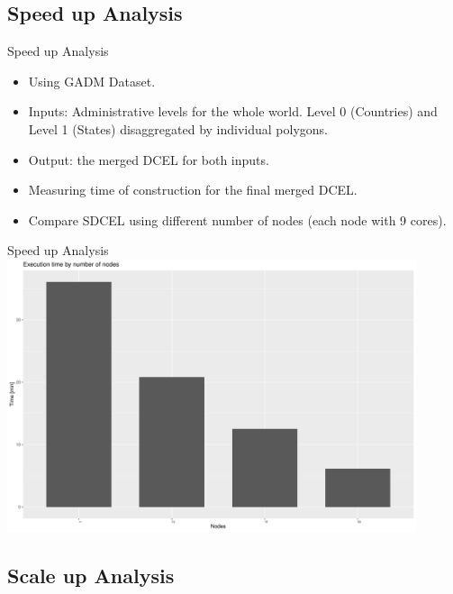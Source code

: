 \documentclass{beamer}
\begin{document}
\subsection{Speed up Analysis}

\begin{frame}{Speed up Analysis}
    \begin{itemize}
        \item Using GADM Dataset.
        \item Inputs: Administrative levels for the whole world.  Level 0 (Countries) and Level 1 (States) disaggregated by individual polygons.
        \item Output: the merged DCEL for both inputs.
        \item Measuring time of construction for the final merged DCEL.
        \item Compare SDCEL using different number of nodes (each node with 9 cores).
    \end{itemize}
\end{frame}
\begin{frame}{Speed up Analysis}
    \centering 
    \includegraphics[width=0.9\textwidth]{figures/speedup.pdf}
\end{frame}

\subsection{Scale up Analysis}
\end{document}
